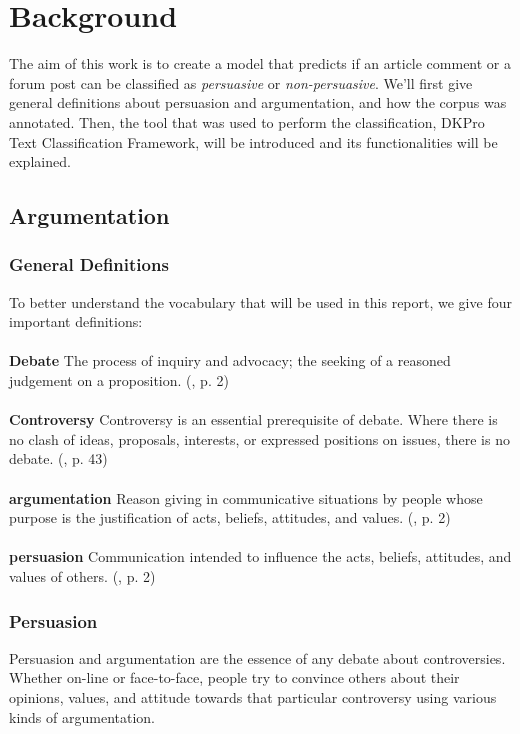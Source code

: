 \chapter{Background} 
The aim of this work is to create a model that predicts if an article comment or a forum post can be classified as \emph{persuasive} or \emph{non-persuasive}. We'll first give general definitions about persuasion and argumentation, and how the corpus was annotated. Then, the tool that was used to perform the classification, DKPro Text Classification Framework, will be introduced and its functionalities will be explained.
\section{Argumentation} 
\subsection{General Definitions}
To better understand the vocabulary that will be used in this report, we give four important definitions:
\\
\\
\textbf{Debate} The process of inquiry and advocacy; the seeking of a reasoned judgement on a proposition. (\cite{freeley2000argumentation}, p. 2)
\\
\\
\textbf{Controversy} Controversy is an essential prerequisite of debate. Where there is no clash of ideas,
proposals, interests, or expressed positions on issues, there is no debate. (\cite{freeley2000argumentation}, p. 43)
\\
\\
\textbf{\Gls{argumentation}} Reason giving in communicative situations by people whose purpose is the justification of acts, beliefs, attitudes, and values. (\cite{freeley2000argumentation}, p. 2)
\\
\\
\textbf{\Gls{persuasion}} Communication intended to influence the acts, beliefs, attitudes, and values of others. (\cite{freeley2000argumentation}, p. 2)

\subsection{Persuasion}
Persuasion and argumentation are the essence of any debate about controversies. Whether on-line or face-to-face, people try to convince others about their opinions, values, and attitude towards that particular controversy using various kinds of argumentation.

